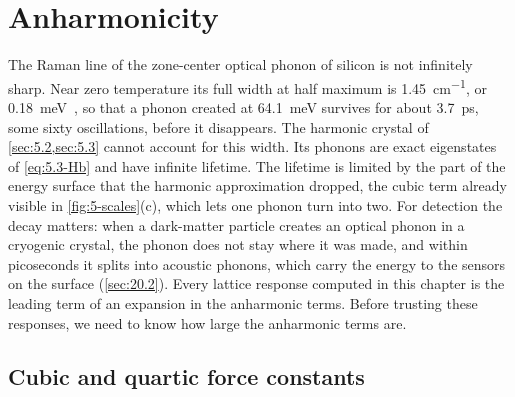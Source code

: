 \section{Anharmonicity}\label{sec:5.7}

The Raman line of the zone-center optical phonon of silicon is not infinitely sharp. Near zero temperature its full width at half maximum is \SI{1.45}{cm^{-1}}, or \SI{0.18}{meV}~\cite{menendez1984temperature}, so that a phonon created at \SI{64.1}{meV} survives for about \SI{3.7}{ps}, some sixty oscillations, before it disappears. The harmonic crystal of \cref{sec:5.2,sec:5.3} cannot account for this width. Its phonons are exact eigenstates of \cref{eq:5.3-Hb} and have infinite lifetime. The lifetime is limited by the part of the energy surface that the harmonic approximation dropped, the cubic term already visible in \cref{fig:5-scales}(c), which lets one phonon turn into two. For detection the decay matters: when a dark-matter particle creates an optical phonon in a cryogenic crystal, the phonon does not stay where it was made, and within picoseconds it splits into acoustic phonons, which carry the energy to the sensors on the surface (\cref{sec:20.2}). Every lattice response computed in this chapter is the leading term of an expansion in the anharmonic terms. Before trusting these responses, we need to know how large the anharmonic terms are.

\subsection{Cubic and quartic force constants}

